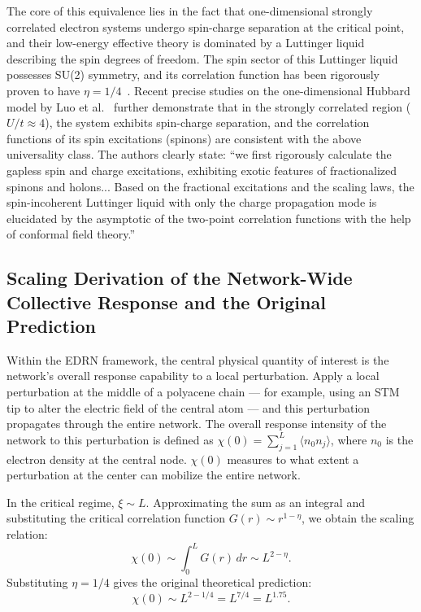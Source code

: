 \documentclass[prb,reprint,twocolumn,superscriptaddress]{revtex4-2}
\begin{document}
The core of this equivalence lies in the fact that one-dimensional strongly correlated electron systems undergo spin-charge separation at the critical point, and their low-energy effective theory is dominated by a Luttinger liquid describing the spin degrees of freedom. The spin sector of this Luttinger liquid possesses SU(2) symmetry, and its correlation function has been rigorously proven to have $\eta = 1/4$~\cite{Affleck1989,Giamarchi2004,Schulz1990}. Recent precise studies on the one-dimensional Hubbard model by Luo et al.~\cite{Luo2023,Luo2024} further demonstrate that in the strongly correlated region ($U/t \approx 4$), the system exhibits spin-charge separation, and the correlation functions of its spin excitations (spinons) are consistent with the above universality class. The authors clearly state: ``we first rigorously calculate the gapless spin and charge excitations, exhibiting exotic features of fractionalized spinons and holons... Based on the fractional excitations and the scaling laws, the spin-incoherent Luttinger liquid with only the charge propagation mode is elucidated by the asymptotic of the two-point correlation functions with the help of conformal field theory.''~\cite{Luo2024}

\subsection{Scaling Derivation of the Network-Wide Collective Response and the Original Prediction}

Within the EDRN framework, the central physical quantity of interest is the network's overall response capability to a local perturbation. Apply a local perturbation at the middle of a polyacene chain --- for example, using an STM tip to alter the electric field of the central atom --- and this perturbation propagates through the entire network. The overall response intensity of the network to this perturbation is defined as $\chi(0) = \sum_{j=1}^{L} \langle n_0 n_j \rangle$, where $n_0$ is the electron density at the central node. $\chi(0)$ measures to what extent a perturbation at the center can mobilize the entire network.

In the critical regime, $\xi \sim L$. Approximating the sum as an integral and substituting the critical correlation function $G(r) \sim r^{1-\eta}$, we obtain the scaling relation:
\begin{equation}
\chi(0) \sim \int_0^L G(r)\,dr \sim L^{2-\eta}. \label{eq:scaling}
\end{equation}
Substituting $\eta = 1/4$ gives the original theoretical prediction:
\begin{equation}
\chi(0) \sim L^{2-1/4} = L^{7/4} = L^{1.75}. \label{eq:prediction}
\end{equation}
\end{document}

